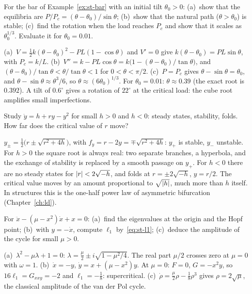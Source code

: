 \label{exo:st-imperfect-bar}
%
%
For the bar of Example~\ref{ex:st-bar} with an initial tilt $\theta_0 > 0$:
(a)~show that the equilibria are $P/P_c = (\theta - \theta_0)/\sin\theta$;
(b)~show that the natural path ($\theta > \theta_0$) is stable;
(c)~find the rotation when the load reaches $P_c$ and show that it scales as
$\theta_0^{1/3}$. Evaluate it for $\theta_0 = 0.01$.
\begin{solution}
(a)~$V = \tfrac12 k(\theta - \theta_0)^2 - PL(1 - \cos\theta)$ and $V' = 0$ give
$k(\theta - \theta_0) = PL\sin\theta$, with $P_c = k/L$.
(b)~$V'' = k - PL\cos\theta = k\bigl(1 - (\theta - \theta_0)/\tan\theta\bigr)$, and
$(\theta - \theta_0)/\tan\theta < \theta/\tan\theta < 1$ for $0 < \theta < \pi/2$.
(c)~$P = P_c$ gives $\theta - \sin\theta = \theta_0$, and
$\theta - \sin\theta \approx \theta^3/6$, so $\theta \approx (6\theta_0)^{1/3}$. For
$\theta_0 = 0.01$: $\theta \approx 0.39$ (the exact root is $0.392$). A tilt of
$0.6^\circ$ gives a rotation of $22^\circ$ at the critical load: the cube root
amplifies small imperfections.
\end{solution}

\label{exo:st-imptrans}
%
Study $\dot y = h + ry - y^2$ for small $h > 0$ and $h < 0$: steady states,
stability, folds. How far does the critical value of $r$ move?
\begin{solution}
$y_\pm = \tfrac12\bigl(r \pm \sqrt{r^2 + 4h}\bigr)$, with $f_y = r - 2y = \mp\sqrt{r^2+4h}$:
$y_+$ is stable, $y_-$ unstable. For $h > 0$ the square root is always real: two
separate branches, a hyperbola, and the exchange of stability is replaced by a smooth
passage on $y_+$. For $h < 0$ there are no steady states for $\lvert r\rvert < 2\sqrt{-h}$,
and folds at $r = \pm2\sqrt{-h}$, $y = r/2$. The critical value moves by an amount
proportional to $\sqrt{\lvert h\rvert}$, much more than $h$ itself. In structures this is the
one-half power law of asymmetric bifurcation (Chapter~\ref{ch:ld}).
\end{solution}

\label{exo:st-vdp}
%
For $\ddot x - (\mu - x^2)\dot x + x = 0$: (a)~find the eigenvalues at the origin and
the Hopf point; (b)~with $y = -\dot x$, compute $\ell_1$ by~\eqref{eq:st-l1};
(c)~deduce the amplitude of the cycle for small $\mu > 0$.
\begin{solution}
(a)~$\lambda^2 - \mu\lambda + 1 = 0$: $\lambda = \tfrac\mu2 \pm i\sqrt{1 - \mu^2/4}$.
The real part $\mu/2$ crosses zero at $\mu = 0$ with $\omega = 1$.
(b)~$\dot x = -y$, $\dot y = x + (\mu - x^2)y$. At $\mu = 0$: $F = 0$,
$G = -x^2y$, so $16\ell_1 = G_{xxy} = -2$ and $\ell_1 = -\tfrac18$: supercritical.
(c)~$\dot\rho = \tfrac\mu2\rho - \tfrac18\rho^3$ gives $\rho = 2\sqrt\mu$, the classical
amplitude of the van der Pol cycle.
\end{solution}


